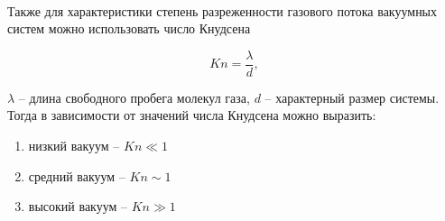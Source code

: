 \documentclass[a4paper,12pt]{article}
\begin{document}
\paragraph{}
Также для характеристики степень разреженности газового 
потока вакуумных систем можно использовать число Кнудсена
	
	\begin{equation}
		Kn = \frac{\lambda}{d}, 
	\end{equation}

	$\lambda$ -- длина свободного пробега молекул газа, $d$ -- характерный размер системы. \\
	
	Тогда в зависимости от значений числа Кнудсена можно выразить:
\begin{enumerate}
\itemsep0em
\item низкий вакуум -- $Kn \ll 1$
\item средний вакуум -- $Kn \sim 1$
\item высокий вакуум -- $Kn \gg 1$
\end{enumerate}	
\end{document}
